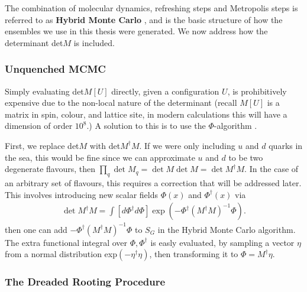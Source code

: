 The combination of molecular dynamics, refreshing steps and Metropolis steps is referred to as {\bf{Hybrid Monte Carlo}} \cite{DUANE1987216}, and is the basic structure of how the ensembles we use in this thesis were generated. We now address how the determinant det$M$ is included.

\subsubsection{Unquenched MCMC}

Simply evaluating det$M[U]$ directly, given a configuration $U$, is prohibitively expensive due to the non-local nature of the determinant (recall $M[U]$ is a matrix in spin, colour, and lattice site, in modern calculations this will have a dimension of order $10^8$.) A solution to this is to use the $\Phi$-algorithm \cite{PhysRevD.35.2531}.

First, we replace det$M$ with det$M^{\dagger}M$. If we were only including $u$ and $d$ quarks in the sea, this would be fine since we can approximate $u$ and $d$ to be two degenerate flavours, then $\prod_q \det M_q = \det M \det M = \det M^{\dagger} M$. In the case of an arbitrary set of flavours, this requires a correction that will be addressed later.
This involves introducing new scalar fields $\Phi(x)$ and $\Phi^{\dagger}(x)$ via
\begin{align}
  \det M^{\dagger} M = \int [d\Phi^{\dagger}d\Phi] \exp(-\Phi^{\dagger} (M^{\dagger}M)^{-1}\Phi).
\end{align}
then one can add $-\Phi^{\dagger} (M^{\dagger}M)^{-1}\Phi$ to $S_G$ in the Hybrid Monte Carlo algorithm. The extra functional integral over $\Phi,\Phi^{\dagger}$ is easly evaluated, by sampling a vector $\eta$ from a normal distribution exp$(-\eta^{\dagger}\eta)$, then transforming it to $\Phi = M^{\dagger} \eta$.

\subsubsection{The Dreaded Rooting Procedure}

